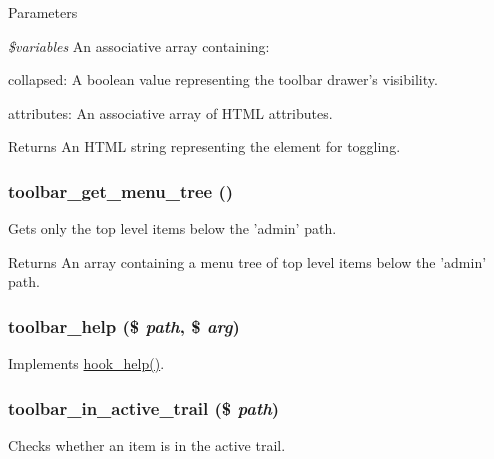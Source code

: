 \begin{DoxyParams}{Parameters}
\item[{\em \$variables}]An associative array containing:
\begin{DoxyItemize}
\item collapsed: A boolean value representing the toolbar drawer's visibility.
\item attributes: An associative array of HTML attributes.
\end{DoxyItemize}\end{DoxyParams}
\begin{DoxyReturn}{Returns}
An HTML string representing the element for toggling. 
\end{DoxyReturn}
\hypertarget{toolbar_8module_abe825f7b728aa4d86fd8326f6b5417ee}{
\subsubsection[{toolbar\_\-get\_\-menu\_\-tree}]{\setlength{\rightskip}{0pt plus 5cm}toolbar\_\-get\_\-menu\_\-tree ()}}
\label{toolbar_8module_abe825f7b728aa4d86fd8326f6b5417ee}
Gets only the top level items below the 'admin' path.

\begin{DoxyReturn}{Returns}
An array containing a menu tree of top level items below the 'admin' path. 
\end{DoxyReturn}
\hypertarget{toolbar_8module_a9767153f4d8af0ed3c0a8e5d236c45be}{
\subsubsection[{toolbar\_\-help}]{\setlength{\rightskip}{0pt plus 5cm}toolbar\_\-help (\$ {\em path}, \/  \$ {\em arg})}}
\label{toolbar_8module_a9767153f4d8af0ed3c0a8e5d236c45be}
Implements \hyperlink{group__hooks_ga5589c2714a782738e8851c4c90231f0e}{hook\_\-help()}. \hypertarget{toolbar_8module_ae0f25c4df3fe3bc3fa83bc0bdd3a8606}{
\subsubsection[{toolbar\_\-in\_\-active\_\-trail}]{\setlength{\rightskip}{0pt plus 5cm}toolbar\_\-in\_\-active\_\-trail (\$ {\em path})}}
\label{toolbar_8module_ae0f25c4df3fe3bc3fa83bc0bdd3a8606}
Checks whether an item is in the active trail.

